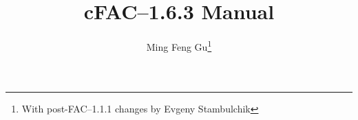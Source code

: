 \documentclass[twoside,a4paper]{refrep}
\newcommand{\cFAC}{{cFAC}\xspace}
\newcommand{\facversion}{{1.6.3}\xspace}
\newcounter{faq}[section]
\newcommand{\+}{\discretionary{\mbox{\scriptsize$\hookleftarrow$}}{}{}}
\begin{document}
\title{\cFAC--\facversion Manual}
\author{Ming Feng Gu\thanks{With post-FAC--1.1.1 changes by Evgeny Stambulchik}}

\date{}

\maketitle

\tableofcontents

















\printindex


\end{document}
